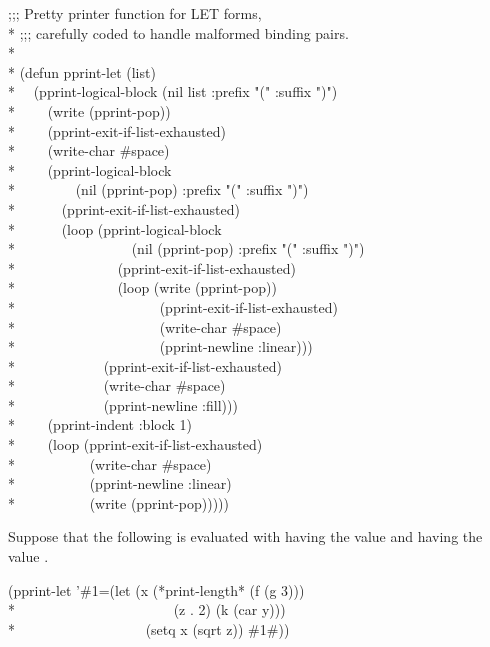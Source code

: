 \begin{lisp}
;;; Pretty printer function for LET forms, \\*
;;; carefully coded to handle malformed binding pairs. \\*
\\*
(defun pprint-let (list) \\*
~~(pprint-logical-block (nil list :prefix "(" :suffix ")") \\*
~~~~(write (pprint-pop)) \\*
~~~~(pprint-exit-if-list-exhausted) \\*
~~~~(write-char \#{\Xbackslash}space) \\*
~~~~(pprint-logical-block \\*
~~~~~~~~(nil (pprint-pop) :prefix "(" :suffix ")") \\*
~~~~~~(pprint-exit-if-list-exhausted) \\*
~~~~~~(loop (pprint-logical-block \\*
~~~~~~~~~~~~~~~~(nil (pprint-pop) :prefix "(" :suffix ")") \\*
~~~~~~~~~~~~~~(pprint-exit-if-list-exhausted) \\*
~~~~~~~~~~~~~~(loop (write (pprint-pop)) \\*
~~~~~~~~~~~~~~~~~~~~(pprint-exit-if-list-exhausted) \\*
~~~~~~~~~~~~~~~~~~~~(write-char \#{\Xbackslash}space) \\*
~~~~~~~~~~~~~~~~~~~~(pprint-newline :linear))) \\*
~~~~~~~~~~~~(pprint-exit-if-list-exhausted) \\*
~~~~~~~~~~~~(write-char \#{\Xbackslash}space) \\*
~~~~~~~~~~~~(pprint-newline :fill))) \\*
~~~~(pprint-indent :block 1) \\*
~~~~(loop (pprint-exit-if-list-exhausted) \\*
~~~~~~~~~~(write-char \#{\Xbackslash}space) \\*
~~~~~~~~~~(pprint-newline :linear) \\*
~~~~~~~~~~(write (pprint-pop)))))
\end{lisp}

Suppose that the following is evaluated with  having the value  and
 having the value .
\begin{lisp}
(pprint-let '\#1=(let (x (*print-length* (f (g 3)))  \\*
~~~~~~~~~~~~~~~~~~~~~~(z . 2) (k (car y))) \\*
~~~~~~~~~~~~~~~~~~(setq x (sqrt z)) \#1\#))
\end{lisp}

